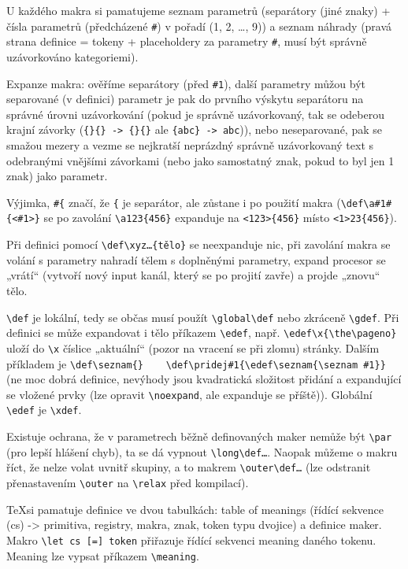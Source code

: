 \documentclass[12pt]{article}					%
\begin{document}
    \begin{definice}
        U každého makra si pamatujeme seznam parametrů (separátory (jiné znaky) + čísla parametrů (předcházené \verb|#|) v pořadí (1, 2, …, 9)) a seznam náhrady (pravá strana definice = tokeny + placeholdery za parametry \verb|#|, musí být správně uzávorkováno kategoriemi).

        Expanze makra: ověříme separátory (před \verb|#1|), další parametry můžou být separované (v definici) parametr je pak do prvního výskytu separátoru na správné úrovni uzávorkování (pokud je správně uzávorkovaný, tak se odeberou krajní závorky (\verb|{}{} -> {}{}| ale \verb|{abc} -> abc|)), nebo neseparované, pak se smažou mezery a vezme se nejkratší neprázdný správně uzávorkovaný text s odebranými vnějšími závorkami (nebo jako samostatný znak, pokud to byl jen 1 znak) jako parametr.

        Výjimka, \verb|#{| značí, že \verb|{| je separátor, ale zůstane i po použití makra (\verb|\def\a#1#{<#1>}| se po zavolání \verb|\a123{456}| expanduje na \verb|<123>{456}| místo \verb|<1>23{456}|).


        Při definici pomocí \verb|\def\xyz…{tělo}| se neexpanduje nic, při zavolání makra se volání s parametry nahradí tělem s doplněnými parametry, expand procesor se „vrátí“ (vytvoří nový input kanál, který se po projití zavře) a projde „znovu“ tělo.

        \verb|\def| je lokální, tedy se občas musí použít \verb|\global\def| nebo zkráceně \verb|\gdef|. Při definici se může expandovat i tělo příkazem \verb|\edef|, např. \verb|\edef\x{\the\pageno}| uloží do \verb|\x| číslice „aktuální“ (pozor na vracení se při zlomu) stránky. Dalším příkladem je \verb|\def\seznam{}    \def\pridej#1{\edef\seznam{\seznam #1}}| (ne moc dobrá definice, nevýhody jsou kvadratická složitost přidání a expandující se vložené prvky (lze opravit \verb|\noexpand|, ale expanduje se příště)). Globální \verb|\edef| je \verb|\xdef|.

        Existuje ochrana, že v parametrech běžně definovaných maker nemůže být \verb|\par| (pro lepší hlášení chyb), ta se dá vypnout \verb|\long\def…|. Naopak můžeme o makru říct, že nelze volat uvnitř skupiny, a to makrem \verb|\outer\def…| (lze odstranit přenastavením \verb|\outer| na \verb|\relax| před kompilací).

        \TeX  si pamatuje definice ve dvou tabulkách: table of meanings (řídící sekvence (cs) -> primitiva, registry, makra, znak, token typu dvojice) a definice maker. Makro \verb|\let cs [=] token| přiřazuje řídící sekvenci meaning daného tokenu. Meaning lze vypsat příkazem \verb|\meaning|.


\end{definice}
\end{document}

